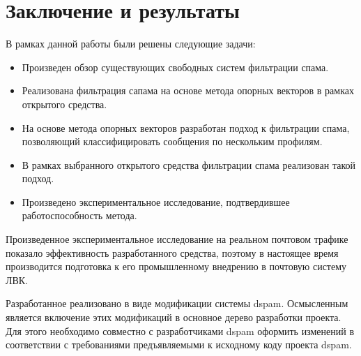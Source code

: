 \newpage
\section{Заключение и результаты}


В рамках данной	работы были решены следующие задачи:
\begin{itemize}
\item Произведен обзор существующих свободных систем фильтрации спама.
\item Реализована фильтрация сапама на основе метода опорных векторов в рамках открытого средства.
\item На основе метода опорных векторов разработан подход к фильтрации спама, позволяющий классифицировать сообщения по нескольким профилям.
\item В рамках выбранного открытого средства фильтрации спама реализован такой подход.
\item Произведено экспериментальное исследование, подтвердившее работоспособность метода.
\end{itemize}


Произведенное экспериментальное исследование на реальном почтовом трафике показало эффективность разработанного средства, поэтому в настоящее время производится подготовка к его промышленному внедрению в почтовую систему ЛВК.

Разработанное реализовано в виде модификации системы dspam. Осмысленным является включение этих модификаций в основное дерево разработки проекта. Для этого необходимо совместно с разработчиками dspam оформить изменений в соответствии с требованиями предъявляемыми к исходному коду проекта dspam. 
